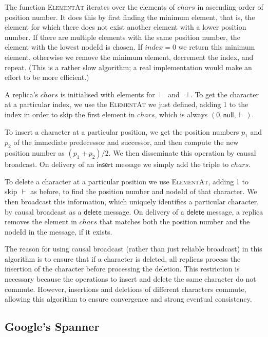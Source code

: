 The function \textsc{ElementAt} iterates over the elements of $\mathit{chars}$ in ascending order of position number.
It does this by first finding the minimum element, that is, the element for which there does not exist another element with a lower position number.
If there are multiple elements with the same position number, the element with the lowest nodeId is chosen.
If $\mathit{index}=0$ we return this minimum element, otherwise we remove the minimum element, decrement the index, and repeat.
(This is a rather slow algorithm; a real implementation would make an effort to be more efficient.)

A replica's $\mathit{chars}$ is initialised with elements for $\vdash$ and $\dashv$.
To get the character at a particular index, we use the \textsc{ElementAt} we just defined, adding 1 to the index in order to skip the first element in $\mathit{chars}$, which is always $(0,\mathsf{null},\vdash)$.

To insert a character at a particular position, we get the position numbers $p_1$ and $p_2$ of the immediate predecessor and successor, and then compute the new position number as $(p_1+p_2)/2$.
We then disseminate this operation by causal broadcast.
On delivery of an $\mathsf{insert}$ message we simply add the triple to $\mathit{chars}$.

To delete a character at a particular position we use \textsc{ElementAt}, adding 1 to skip $\vdash$ as before, to find the position number and nodeId of that character.
We then broadcast this information, which uniquely identifies a particular character, by causal broadcast as a $\mathsf{delete}$ message.
On delivery of a $\mathsf{delete}$ message, a replica removes the element in $\mathit{chars}$ that matches both the position number and the nodeId in the message, if it exists.

The reason for using causal broadcast (rather than just reliable broadcast) in this algorithm is to ensure that if a character is deleted, all replicas process the insertion of the character before processing the deletion.
This restriction is necessary because the operations to insert and delete the same character do not commute.
However, insertions and deletions of different characters commute, allowing this algorithm to ensure convergence and strong eventual consistency.

\subsection{Google's Spanner}\label{sec:spanner}

